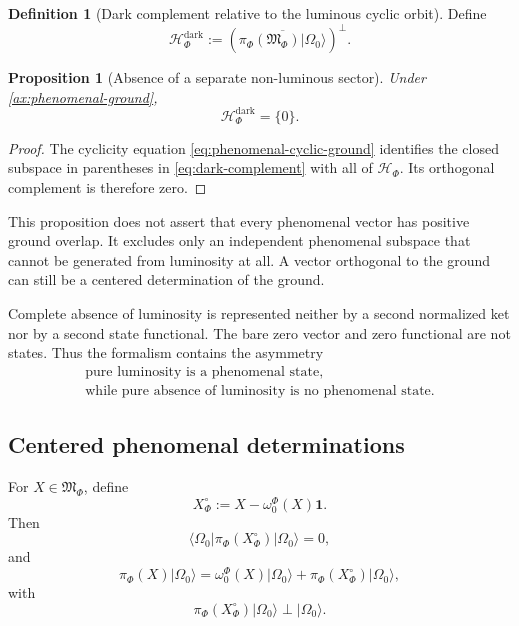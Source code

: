 \documentclass[11pt,reqno]{scrartcl}
\newcommand{\scrHF}{\mathscr H_{\Phi}}
\newcommand{\algF}{\mathfrak M_{\Phi}}
\newcommand{\piF}{\pi_{\Phi}}
\newcommand{\omegaF}{\omega_{0}^{\Phi}}
\newcommand{\idop}{\mathbf 1}
\newcommand{\ket}[1]{\lvert #1\rangle}
\newcommand{\bra}[1]{\langle #1\rvert}
\theoremstyle{plain}
\newtheorem{proposition}[proposition]{Proposition}
\theoremstyle{definition}
\newtheorem{definition}[definition]{Definition}
\theoremstyle{remark}
\begin{document}
\begin{definition}[Dark complement relative to the luminous cyclic orbit]
\label{def:dark-complement}
Define
\begin{equation}
  \scrHF^{\mathrm{dark}}
  :=
  \left(
  \overline{\piF(\algF)\ket{\Omega_0}}
  \right)^{\perp}.
  \label{eq:dark-complement}
\end{equation}
\end{definition}

\begin{proposition}[Absence of a separate non-luminous sector]
\label{prop:no-dark-sector}
Under \cref{ax:phenomenal-ground},
\begin{equation}
  \scrHF^{\mathrm{dark}}=\{0\}.
\end{equation}
\end{proposition}

\begin{proof}
The cyclicity equation \eqref{eq:phenomenal-cyclic-ground} identifies the
closed subspace in parentheses in \eqref{eq:dark-complement} with all of
$\scrHF$.  Its orthogonal complement is therefore zero.
\end{proof}

This proposition does not assert that every phenomenal vector has positive
ground overlap.  It excludes only an independent phenomenal subspace that
cannot be generated from luminosity at all.  A vector orthogonal to the ground
can still be a centered determination of the ground.

Complete absence of luminosity is represented neither by a second normalized
ket nor by a second state functional.  The bare zero vector and zero
functional are not states.  Thus the formalism contains the asymmetry
\begin{equation}
  \boxed{
  \begin{gathered}
  \text{pure luminosity is a phenomenal state,}\\
  \text{while pure absence of luminosity is no phenomenal state.}
  \end{gathered}}
  \label{eq:no-nonluminosity-state}
\end{equation}

\subsection{Centered phenomenal determinations}

For $X\in\algF$, define
\begin{equation}
  X^{\circ}_{\Phi}
  :=X-\omegaF(X)\idop.
  \label{eq:phenomenal-centered-operator}
\end{equation}
Then
\begin{equation}
  \bra{\Omega_0}\piF(X^{\circ}_{\Phi})\ket{\Omega_0}=0,
\end{equation}
and
\begin{equation}
  \piF(X)\ket{\Omega_0}
  =\omegaF(X)\ket{\Omega_0}
  +\piF(X^{\circ}_{\Phi})\ket{\Omega_0},
  \label{eq:phenomenal-centered-decomposition}
\end{equation}
with
\begin{equation}
  \piF(X^{\circ}_{\Phi})\ket{\Omega_0}
  \perp
  \ket{\Omega_0}.
\end{equation}
\end{document}

